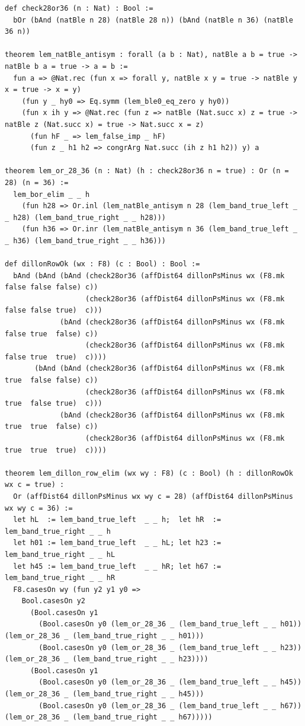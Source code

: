 \documentclass[11pt,letterpaper]{article}
\theoremstyle{spectralthm}
\begin{document}
\begin{lstlisting}[language=Lean4,caption={Standalone Pure Init.Prelude Term-Mode Lean 4 Kernel Suite (thm30--thm61, v0.0.0, 0 sorry, 0 axioms).},label={lst:lean_unified}]
def check28or36 (n : Nat) : Bool :=
  bOr (bAnd (natBle n 28) (natBle 28 n)) (bAnd (natBle n 36) (natBle 36 n))

theorem lem_natBle_antisym : forall (a b : Nat), natBle a b = true -> natBle b a = true -> a = b :=
  fun a => @Nat.rec (fun x => forall y, natBle x y = true -> natBle y x = true -> x = y)
    (fun y _ hy0 => Eq.symm (lem_ble0_eq_zero y hy0))
    (fun x ih y => @Nat.rec (fun z => natBle (Nat.succ x) z = true -> natBle z (Nat.succ x) = true -> Nat.succ x = z)
      (fun hF _ => lem_false_imp _ hF)
      (fun z _ h1 h2 => congrArg Nat.succ (ih z h1 h2)) y) a

theorem lem_or_28_36 (n : Nat) (h : check28or36 n = true) : Or (n = 28) (n = 36) :=
  lem_bor_elim _ _ h
    (fun h28 => Or.inl (lem_natBle_antisym n 28 (lem_band_true_left _ _ h28) (lem_band_true_right _ _ h28)))
    (fun h36 => Or.inr (lem_natBle_antisym n 36 (lem_band_true_left _ _ h36) (lem_band_true_right _ _ h36)))

def dillonRowOk (wx : F8) (c : Bool) : Bool :=
  bAnd (bAnd (bAnd (check28or36 (affDist64 dillonPsMinus wx (F8.mk false false false) c))
                   (check28or36 (affDist64 dillonPsMinus wx (F8.mk false false true)  c)))
             (bAnd (check28or36 (affDist64 dillonPsMinus wx (F8.mk false true  false) c))
                   (check28or36 (affDist64 dillonPsMinus wx (F8.mk false true  true)  c))))
       (bAnd (bAnd (check28or36 (affDist64 dillonPsMinus wx (F8.mk true  false false) c))
                   (check28or36 (affDist64 dillonPsMinus wx (F8.mk true  false true)  c)))
             (bAnd (check28or36 (affDist64 dillonPsMinus wx (F8.mk true  true  false) c))
                   (check28or36 (affDist64 dillonPsMinus wx (F8.mk true  true  true)  c))))

theorem lem_dillon_row_elim (wx wy : F8) (c : Bool) (h : dillonRowOk wx c = true) :
  Or (affDist64 dillonPsMinus wx wy c = 28) (affDist64 dillonPsMinus wx wy c = 36) :=
  let hL  := lem_band_true_left  _ _ h;  let hR  := lem_band_true_right _ _ h
  let h01 := lem_band_true_left  _ _ hL; let h23 := lem_band_true_right _ _ hL
  let h45 := lem_band_true_left  _ _ hR; let h67 := lem_band_true_right _ _ hR
  F8.casesOn wy (fun y2 y1 y0 =>
    Bool.casesOn y2
      (Bool.casesOn y1
        (Bool.casesOn y0 (lem_or_28_36 _ (lem_band_true_left _ _ h01)) (lem_or_28_36 _ (lem_band_true_right _ _ h01)))
        (Bool.casesOn y0 (lem_or_28_36 _ (lem_band_true_left _ _ h23)) (lem_or_28_36 _ (lem_band_true_right _ _ h23))))
      (Bool.casesOn y1
        (Bool.casesOn y0 (lem_or_28_36 _ (lem_band_true_left _ _ h45)) (lem_or_28_36 _ (lem_band_true_right _ _ h45)))
        (Bool.casesOn y0 (lem_or_28_36 _ (lem_band_true_left _ _ h67)) (lem_or_28_36 _ (lem_band_true_right _ _ h67)))))


\end{lstlisting}
\end{document}
